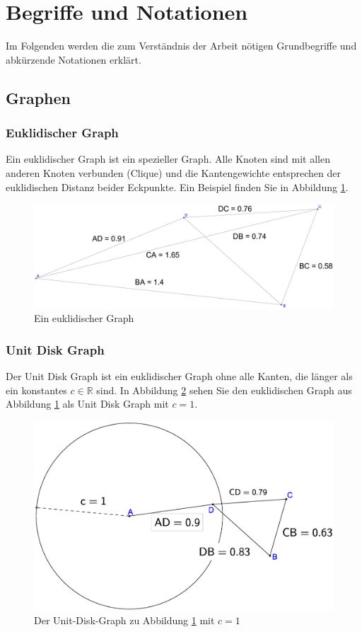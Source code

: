 \documentclass[a4paper,twoside]{IEEEtran}
\begin{document}
\section{Begriffe und Notationen}
Im Folgenden werden die zum Verständnis der Arbeit nötigen Grundbegriffe und abkürzende Notationen erklärt.




\subsection{Graphen}
\subsubsection{Euklidischer Graph}
Ein euklidischer Graph ist ein spezieller Graph. 
Alle Knoten sind mit allen anderen Knoten verbunden (Clique) und die Kantengewichte entsprechen der euklidischen Distanz beider Eckpunkte. 
Ein Beispiel finden Sie in Abbildung \ref{fig:Graph}.
\begin{figure}[h!]
\centering
\includegraphics[width=0.99\linewidth]{Graph.eps}
\caption{Ein euklidischer Graph}
\label{fig:Graph}
\end{figure}
\subsubsection{Unit Disk Graph}
Der Unit Disk Graph ist ein euklidischer Graph ohne alle Kanten, die länger als ein konstantes $c \in \mathds{R} $ sind.
In Abbildung \ref{fig:UnitGraph} sehen Sie den euklidischen Graph aus Abbildung \ref{fig:Graph} als Unit Disk Graph mit $c = 1 $.
\begin{figure}[h!]
\centering
\includegraphics[width=0.99\linewidth]{UnitGraph.eps}
\caption{Der Unit-Disk-Graph zu Abbildung \ref{fig:Graph} mit $c = 1 $}
\label{fig:UnitGraph}
\end{figure}
\end{document}
